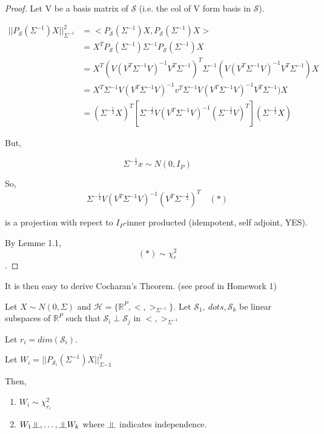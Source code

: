 \documentclass[11pt,fleqn]{book} %
\newcommand{\indep}{\rotatebox[origin=c]{90}{$\models$}}
\begin{document}
  	\begin{proof}
  		Let V be a basis matrix of $\mathscr{S}$ (i.e. the col of V form basis in $\mathscr{S}$).

  		$\begin{aligned}
  			||P_\mathscr{S}(\Sigma^{-1})X||^2_{\Sigma^{-1}} &= <P_\mathscr{S} (\Sigma^{-1}) X, P_\mathscr{S} (\Sigma^{-1}) X>\\
  				&= X^T P_\mathscr{S} (\Sigma^{-1}) \Sigma^{-1} P_\mathscr{S} (\Sigma^{-1}) X\\
  				&= X^T (V(V^T \Sigma^{-1} V)^{-1} V^T \Sigma^{-1})^T \Sigma^{-1} (V(V^T \Sigma^{-1} V)^{-1} V^T \Sigma^{-1}) X\\
  				&= X^T \Sigma^{-1} V(V^T \Sigma^{-1} V)^{-1} v^T \Sigma^{-1} V(V^T \Sigma^{-1} V)^{-1} V^T \Sigma^{-1}) X\\
  				&= (\Sigma^{-\frac{1}{2}} X)^T[\Sigma^{-\frac{1}{2}} V(V^T \Sigma^{-1} V)^{-1} (\Sigma^{-\frac{1}{2}} V)^T] (\Sigma^{-\frac{1}{2}} X)
  		\end{aligned}$

  		But, 

  		$$\Sigma^{-\frac{1}{2}} x \sim N(0, I_P) $$

  		So, 
  		$$ \Sigma^{-\frac{1}{2}} V(V^T \Sigma^{-1} V)^{-1} (V^T \Sigma^{-\frac{1}{2}})^T \quad (*)$$

  		is a projection with repect to $I_P$-inner producted (idempotent, self adjoint, YES). 

  		By Lemme 1.1, $$ (*) \sim \chi^2_r$$.

  		
  	\end{proof}
 
 It is then easy to derive Cocharan's Theorem. (see proof in Homework 1)

\begin{theorem}
	Let $X \sim N(0, \Sigma)$ and $\mathscr{H} = \{\mathbb{R}^P, <,>_{\Sigma^{-1}} \}$. Let $\mathscr{S}_1, \ dots, \mathscr{S}_k$ be linear subspaces of $\mathbb{R}^P$ such that $\mathscr{S}_i\perp\mathscr{S}_j$ in $<,>_{\Sigma^{-1}}$ 

	Let $r_i = dim(\mathscr{S}_i)$.

	Let $W_i = || P_{\mathscr{S}_i} (\Sigma^{-1}) X||^2_{\Sigma{-1}}$

	Then, 

	\begin{enumerate}
		\item $W_i \sim \chi^2_{r_i}$
		\item $W_1 \indep, \dots, \indep W_k$ where $\indep$ indicates independence.
	\end{enumerate}
\end{theorem}
\end{document}
